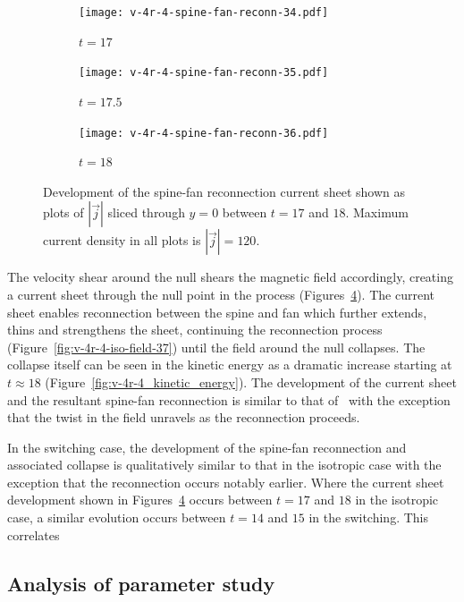 \begin{figure}[t]
  \centering
    \begin{subfigure}{0.32\textwidth}
      \texttt{[image: v-4r-4-spine-fan-reconn-34.pdf]}
      \caption{$t=17$}
      \label{fig:v-4r-4-spine-fan-reconn-34}
    \end{subfigure}
    \hfill
    \begin{subfigure}{0.32\textwidth}
      \texttt{[image: v-4r-4-spine-fan-reconn-35.pdf]}
      \caption{$t=17.5$}
      \label{fig:v-4r-4-spine-fan-reconn-35}
    \end{subfigure}
    \hfill
    \begin{subfigure}{0.32\textwidth}
      \texttt{[image: v-4r-4-spine-fan-reconn-36.pdf]}
      \caption{$t=18$}
      \label{fig:v-4r-4-spine-fan-reconn-36}
    \end{subfigure}
\caption{Development of the spine-fan reconnection current sheet shown as plots of $|\vec{j}|$ sliced through $y=0$ between $t=17$ and $18$. Maximum current density in all plots is $|\vec{j}| = 120$.}
\label{fig:spine_fan_reconnection_current_sheet}
\end{figure}

The velocity shear around the null shears the magnetic field accordingly, creating a current sheet through the null point in the process (Figures~\ref{fig:spine_fan_reconnection_current_sheet}). The current sheet enables reconnection between the spine and fan which further extends, thins and strengthens the sheet, continuing the reconnection process (Figure~\ref{fig:v-4r-4-iso-field-37}) until the field around the null collapses. The collapse itself can be seen in the kinetic energy as a dramatic increase starting at $t\approx18$ (Figure~\ref{fig:v-4r-4_kinetic_energy}). The development of the current sheet and the resultant spine-fan reconnection is similar to that of~\cite{pontinCurrentSheetFormation2007} with the exception that the twist in the field unravels as the reconnection proceeds. 

In the switching case, the development of the spine-fan reconnection and associated collapse is qualitatively similar to that in the isotropic case with the exception that the reconnection occurs notably earlier. Where the current sheet development shown in Figures~\ref{fig:spine_fan_reconnection_current_sheet} occurs between $t=17$ and $18$ in the isotropic case, a similar evolution occurs between $t=14$ and $15$ in the switching. This correlates 

\subsection{Analysis of parameter study}


